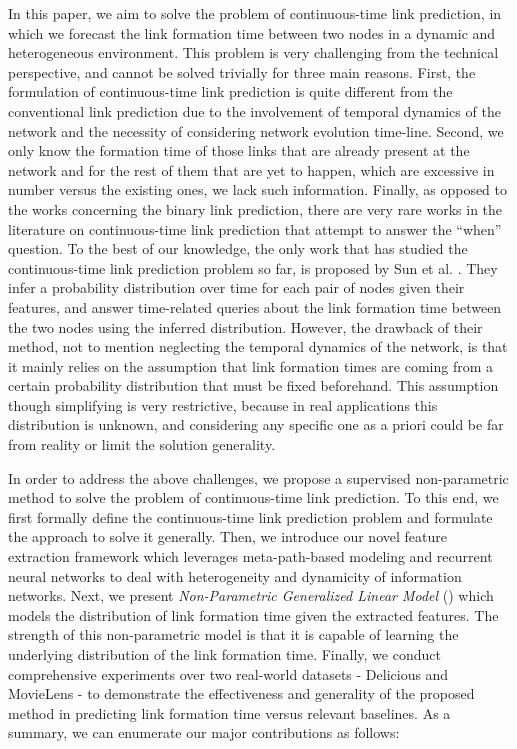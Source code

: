 In this paper, we aim to solve the problem of continuous-time link prediction, in which we forecast the link formation time between two nodes in a dynamic and heterogeneous environment. This problem is very challenging from the technical perspective, and cannot be solved trivially for three main reasons. First, the formulation of continuous-time link prediction is quite different from the conventional link prediction due to the involvement of temporal dynamics of the network and the necessity of considering network evolution time-line. Second, we only know the formation time of those links that are already present at the network and for the rest of them that are yet to happen, which are excessive in number versus the existing ones, we lack such information. Finally, as opposed to the works concerning the binary link prediction, there are very rare works in the literature on continuous-time link prediction that attempt to answer the ``when'' question. To the best of our knowledge, the only work that has studied the continuous-time link prediction problem so far, is proposed by Sun et al. \cite{sun2012will}. They infer a probability distribution over time for each pair of nodes given their features, and answer time-related queries about the link formation time between the two nodes using the inferred distribution. However, the drawback of their method, not to mention neglecting the temporal dynamics of the network, is that it mainly relies on the assumption that link formation times are coming from a certain probability distribution that must be fixed beforehand. This assumption though simplifying is very restrictive, because in real applications this distribution is unknown, and considering any specific one as a priori could be far from reality or limit the solution generality.

In order to address the above challenges, we propose a supervised non-parametric method to solve the problem of continuous-time link prediction. To this end, we first formally define the continuous-time link prediction problem and formulate the approach to solve it generally. Then, we introduce our novel feature extraction framework which leverages meta-path-based modeling and recurrent neural networks to deal with heterogeneity and dynamicity of information networks. Next, we present \emph{Non-Parametric Generalized Linear Model} (\npglm) which models the distribution of link formation time given the extracted features. The strength of this non-parametric model is that it is capable of learning the underlying distribution of the link formation time.
Finally, we conduct comprehensive experiments over two real-world datasets - Delicious and MovieLens - to demonstrate the effectiveness and generality of the proposed method in predicting link formation time versus relevant baselines. As a summary, we can enumerate our major contributions as follows:

